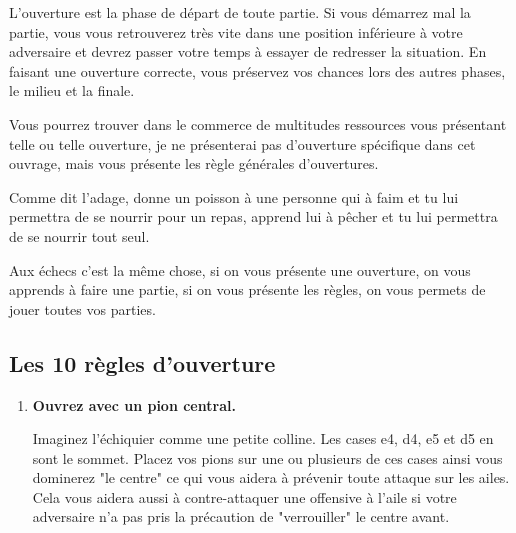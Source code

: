 \documentclass[a5paper,openany,twocolumn]{book}
\begin{document}
{L'ouverture est la phase de départ de toute partie. Si vous démarrez mal la partie, vous vous retrouverez très vite dans une position inférieure à votre adversaire et devrez passer votre temps à essayer de redresser la situation. En faisant une ouverture correcte, vous préservez vos chances lors des autres phases, le milieu et la finale.

Vous pourrez trouver dans le commerce de multitudes ressources vous présentant telle ou telle ouverture, je ne présenterai pas d'ouverture spécifique dans cet ouvrage, mais vous présente les règle générales d'ouvertures. 

Comme dit l'adage, donne un poisson à une personne qui à faim et tu lui permettra de se nourrir pour un repas, apprend lui à pêcher et tu lui permettra de se nourrir tout seul.

Aux échecs c'est la même chose, si on vous présente une ouverture, on vous apprends à faire une partie, si on vous présente les règles, on vous permets de jouer toutes vos parties. 

\subsection{Les 10 règles d'ouverture}

\medskip

\begin{enumerate}


\item \qquad \textbf{Ouvrez avec un pion central.}

\medskip

\qquad Imaginez l'échiquier comme une petite colline. Les cases e4, d4, e5 et d5 en sont le sommet. Placez vos pions sur une ou plusieurs de ces cases ainsi vous dominerez "le centre" ce qui vous aidera à prévenir toute attaque sur les ailes. \\

\qquad Cela vous aidera aussi à contre-attaquer une offensive à l'aile si votre adversaire n'a pas pris la précaution de "verrouiller" le centre avant. \\
%

\begin{center}


\end{center}
\end{enumerate}}
\end{document}
